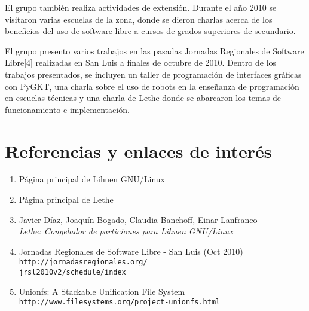 \documentclass[final,narroweqnarray,inline,twoside]{ieee}
\newcommand{\itref}[1]{[{#1}]}
\begin{document}
El grupo también realiza actividades de extensión. Durante el año 2010 se visitaron varias escuelas de la zona, donde se
dieron charlas acerca de los beneficios del uso de software libre a cursos de grados superiores de secundario.

El grupo presento varios trabajos en las pasadas Jornadas Regionales de Software Libre\itref{4} realizadas en San Luis a
finales de octubre de 2010. Dentro de los trabajos presentados, se incluyen un taller de programación de interfaces gráficas
con PyGKT, una charla sobre el uso de robots en la enseñanza de programación en escuelas técnicas y una charla de Lethe donde
se abarcaron los temas de funcionamiento e implementación.

\section{Referencias y enlaces de interés}

\begin{enumerate}
\item Página principal de Lihuen GNU/Linux\\
\item Página principal de Lethe\\
\item Javier Díaz, Joaquín Bogado, Claudia Banchoff, Einar Lanfranco
\\\textit{Lethe: Congelador de particiones para Lihuen GNU/Linux}\\
\item Jornadas Regionales de Software Libre - San Luis (Oct 2010)\\
\texttt{http://jornadasregionales.org/\\
jrsl2010v2/schedule/index}
\item Unionfs: A Stackable Unification File System\\
\texttt{http://www.filesystems.org/project-unionfs.html}
\end{enumerate}
\end{document}
